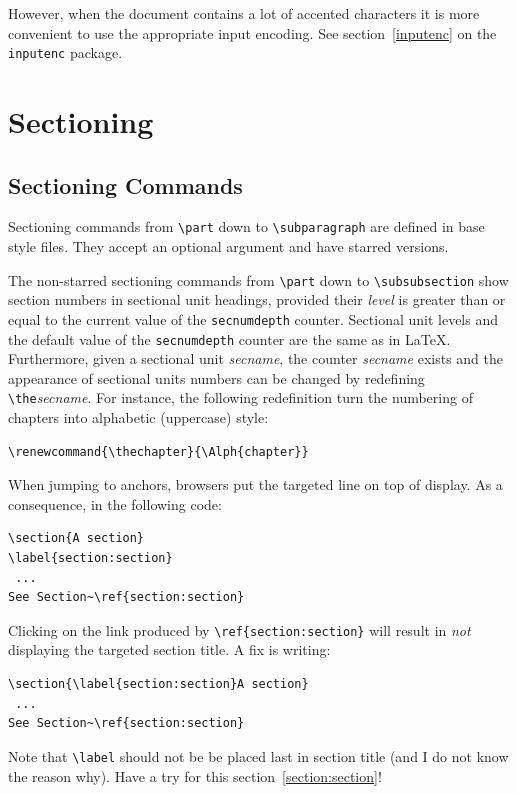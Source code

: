 However, when the document contains a lot of accented characters it is
more convenient to use the appropriate input encoding. See
section~\ref{inputenc} on the \texttt{inputenc} package.

\section{Sectioning}

\subsection{\label{section:section}Sectioning Commands}
Sectioning commands from \verb+\part+ down to
\verb+\subparagraph+ are defined in base style files.
They accept an optional argument and have starred versions.


The non-starred sectioning commands from \verb+\part+ down to
\verb+\subsubsection+ show section numbers in sectional unit headings,
provided their \textit{level} is greater than or equal to the current
value of the \verb+secnumdepth+ counter.
Sectional unit levels and the default value of the \verb+secnumdepth+ counter
are the same as in \LaTeX{}.
Furthermore, given a sectional unit {\it secname}, the
counter {\it secname} exists and the appearance of sectional units
numbers can be changed by redefining \verb+\the+{\it secname}.
For instance, the following redefinition turn the numbering of
chapters into alphabetic (uppercase) style:
\begin{verbatim}
\renewcommand{\thechapter}{\Alph{chapter}}
\end{verbatim}

When jumping to anchors, browsers put the targeted line on top
of display. As a consequence, in the following code:
\begin{verbatim}
\section{A section}
\label{section:section}
 ...
See Section~\ref{section:section}
\end{verbatim}
Clicking on the link produced by
\verb"\ref{section:section}" will result in \emph{not} displaying the
targeted section title.
A fix is writing:
\begin{verbatim}
\section{\label{section:section}A section}
 ...
See Section~\ref{section:section}
\end{verbatim}
Note that \verb+\label+ should not be be placed last in
section title (and I do not know the reason why).
Have a try for this section~\ref{section:section}!

